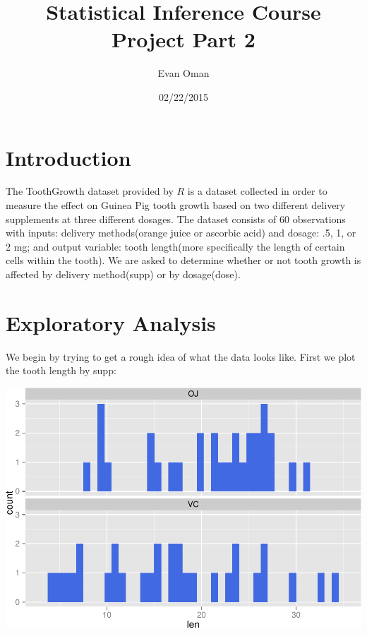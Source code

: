 \documentclass[]{article}
\title{Statistical Inference Course Project Part 2}
\author{Evan Oman}
\date{02/22/2015}
\newenvironment{Shaded}{\begin{snugshade}}{\end{snugshade}}
\newcommand{\KeywordTok}[1]{\textcolor[rgb]{0.13,0.29,0.53}{\textbf{{#1}}}}
\newcommand{\DataTypeTok}[1]{\textcolor[rgb]{0.13,0.29,0.53}{{#1}}}
\newcommand{\DecValTok}[1]{\textcolor[rgb]{0.00,0.00,0.81}{{#1}}}
\newcommand{\FloatTok}[1]{\textcolor[rgb]{0.00,0.00,0.81}{{#1}}}
\newcommand{\StringTok}[1]{\textcolor[rgb]{0.31,0.60,0.02}{{#1}}}
\newcommand{\NormalTok}[1]{{#1}}
\begin{document}
\maketitle


\section{Introduction}

The ToothGrowth dataset provided by \(R\) is a dataset collected in
order to measure the effect on Guinea Pig tooth growth based on two
different delivery supplements at three different dosages. The dataset
consists of 60 observations with inputs: delivery methods(orange juice
or ascorbic acid) and dosage: .5, 1, or 2 mg; and output variable: tooth
length(more specifically the length of certain cells within the tooth).
We are asked to determine whether or not tooth growth is affected by
delivery method(supp) or by dosage(dose).

\section{Exploratory Analysis}

We begin by trying to get a rough idea of what the data looks like.
First we plot the tooth length by supp:

\begin{Shaded}
\end{Shaded}

\includegraphics{SI-Proj2_files/figure-latex/unnamed-chunk-1-1.pdf}
\end{document}
